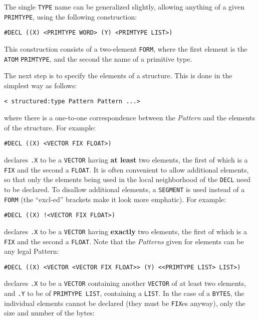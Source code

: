 \documentclass[a4paper]{scrbook}
\begin{document}
The single \texttt{TYPE} name can be generalized slightly, allowing anything of a given \texttt{PRIMTYPE}, using the
following construction:

\begin{verbatim}
#DECL ((X) <PRIMTYPE WORD> (Y) <PRIMTYPE LIST>)
\end{verbatim}

This construction consists of a two-element \texttt{FORM}, where the first element is the \texttt{ATOM} \texttt{PRIMTYPE},
and the second the name of a primitive type.

The next step is to specify the elements of a structure. This is done in the simplest way as follows:

\begin{verbatim}
< structured:type Pattern Pattern ...>
\end{verbatim}

where there is a one-to-one correspondence between the \emph{Pattern} and the elements of the structure. For example:

\begin{verbatim}
#DECL ((X) <VECTOR FIX FLOAT>)
\end{verbatim}

declares \texttt{.X} to be a \texttt{VECTOR} having \textbf{at least} two elements, the first of which is a \texttt{FIX}
and the second a \texttt{FLOAT}. It is often convenient to allow additional elements, so that only the elements being used
in the local neighborhood of the \texttt{DECL} need to be declared. To disallow additional elements, a \texttt{SEGMENT} is
used instead of a \texttt{FORM} (the ``excl-ed'' brackets make it look more emphatic). For example:

\begin{verbatim}
#DECL ((X) !<VECTOR FIX FLOAT>)
\end{verbatim}

declares \texttt{.X} to be a \texttt{VECTOR} having \textbf{exactly} two elements, the first of which is a \texttt{FIX} and
the second a \texttt{FLOAT}. Note that the \emph{Patterns} given for elements can be any legal Pattern:

\begin{verbatim}
#DECL ((X) <VECTOR <VECTOR FIX FLOAT>> (Y) <<PRIMTYPE LIST> LIST>)
\end{verbatim}

declares \texttt{.X} to be a \texttt{VECTOR} containing another \texttt{VECTOR} of at least two elements, and \texttt{.Y}
to be of \texttt{PRIMTYPE\ LIST}, containing a \texttt{LIST}. In the case of a \texttt{BYTES}, the individual elements
cannot be declared (they must be \texttt{FIX}es anyway), only the size and number of the bytes:
\end{document}
